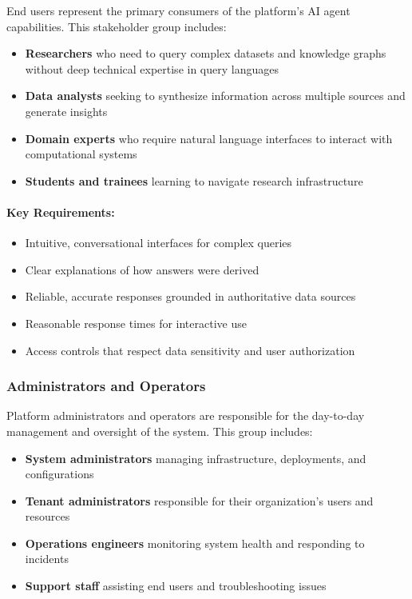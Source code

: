 \documentclass[a4paper,twoside]{sapthesis}
\begin{document}
End users represent the primary consumers of the platform's AI agent capabilities. This stakeholder group includes:

\begin{itemize}
    \item \textbf{Researchers} who need to query complex datasets and knowledge graphs without deep technical expertise in query languages
    \item \textbf{Data analysts} seeking to synthesize information across multiple sources and generate insights
    \item \textbf{Domain experts} who require natural language interfaces to interact with computational systems
    \item \textbf{Students and trainees} learning to navigate research infrastructure
\end{itemize}

\paragraph{Key Requirements:}
\begin{itemize}
    \item Intuitive, conversational interfaces for complex queries
    \item Clear explanations of how answers were derived
    \item Reliable, accurate responses grounded in authoritative data sources
    \item Reasonable response times for interactive use
    \item Access controls that respect data sensitivity and user authorization
\end{itemize}

\subsubsection{Administrators and Operators}

Platform administrators and operators are responsible for the day-to-day management and oversight of the system. This group includes:

\begin{itemize}
    \item \textbf{System administrators} managing infrastructure, deployments, and configurations
    \item \textbf{Tenant administrators} responsible for their organization's users and resources
    \item \textbf{Operations engineers} monitoring system health and responding to incidents
    \item \textbf{Support staff} assisting end users and troubleshooting issues
\end{itemize}
\end{document}
